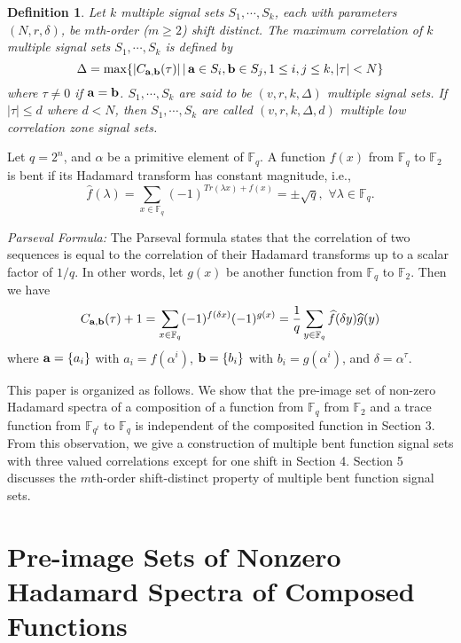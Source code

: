 \documentclass{article}
\newtheorem{definition}{Definition}
\newcommand{\F}{\ensuremath{\mathbb F}}
\newcommand{\abu}{{\bf{a}}}
\newcommand{\bbu}{{\bf{b}}}
\begin{document}
\begin{definition}
Let $k$ multiple signal sets $ S_1, \cdots, S_k$, each with  parameters $(N,  r,  \delta)$, be  $m$th-order ($m\ge 2$) shift distinct.  The maximum correlation of $k$ multiple signal sets $S_1, \cdots, S_k$ is defined by 
\[
\Delta=\max\{|C_{\abu, \bbu}(\tau)| \,|\, \abu\in S_i, \bbu \in S_j, 1\le i, j \le k,  |\tau |< N\}
 \]
where  $\tau\not = 0$ if $\abu=\bbu$.   $ S_1, \cdots, S_k$  are said to be  {\em $(v, r, k, \Delta)$ multiple signal sets}.  If  $|\tau|\le d$ where $d<N$, then $ S_1, \cdots, S_k$ are called {\em $(v, r, k, \Delta, d)$ multiple low correlation zone signal sets}. 
\end{definition}

Let  $q=2^n$, and $\alpha$ be a primitive element of $\F_{q}$.   A function $f(x)$  from $\F_{q}$ to $\F_2$ is bent if its 
Hadamard transform has constant magnitude, i.e.,
\begin{equation}\label{eq13-bent2}
\widehat{f}(\lambda)=\sum_{x \in \F_{q}} (-1)^{Tr(\lambda
x)+f(x)} = \pm \sqrt{q}, \,\,   \forall \lambda \in \F_{q}.
\end{equation}

{\em Parseval Formula:} The Parseval formula states that the
correlation of two sequences is equal to the correlation of their
Hadamard transforms up to a scalar factor of $1/q$. In other words, let $g(x)$ be another
function from $\F_{q}$ to $\F_2$. Then we have
\[C_{\abu, \bbu}(\tau)+1=\sum_{x\in
\F_{q}}(-1)^{f(\delta x)}(-1)^{g( x)}=\frac{1}{q}\sum_{y\in
\F_{q}}\widehat{f}(\delta y)\widehat{g}(y)
\]
where $\abu=\{a_i\}$ with $a_i=f(\alpha^i)$,  $\bbu=\{b_i\}$ with
$b_i=g(\alpha^i)$, and $\delta=\alpha^{\tau}$.

This paper is organized  as follows.    We show  that the pre-image set of non-zero Hadamard spectra of a composition of a function from $\F_{q}$ from $\F_2$ and a trace function from $\F_{q^{l}}$ to $\F_{q}$ is independent of the composited function in Section 3.  From this observation, we give a construction of multiple  bent function signal sets with three valued correlations except for one shift in Section 4.   Section 5 discusses the $m$th-order  shift-distinct property of  multiple bent function signal sets.


\section{Pre-image Sets of Nonzero Hadamard Spectra of Composed Functions}
\end{document}
